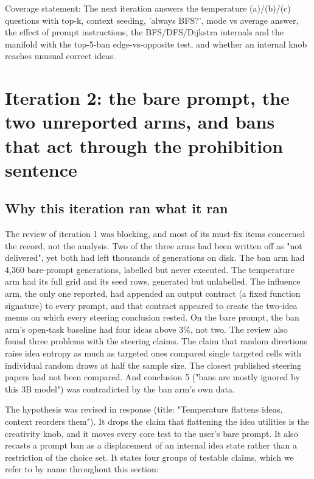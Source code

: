 \documentclass[11pt,letterpaper]{article}
\begin{document}
Coverage statement: The next iteration answers the temperature (a)/(b)/(c) questions with top-k, context seeding, 'always BFS?', mode vs average answer, the effect of prompt instructions, the BFS/DFS/Dijkstra internals and the manifold with the top-5-ban edge-vs-opposite test, and whether an internal knob reaches unusual correct ideas.
\section{Iteration 2: the bare prompt, the two unreported arms, and bans that act through the prohibition sentence}
\subsection{Why this iteration ran what it ran}
The review of iteration 1 was blocking, and most of its must-fix items concerned the record, not the analysis. Two of the three arms had been written off as "not delivered", yet both had left thousands of generations on disk. The ban arm had 4,360 bare-prompt generations, labelled but never executed. The temperature arm had its full grid and its seed rows, generated but unlabelled. The influence arm, the only one reported, had appended an output contract (a fixed function signature) to every prompt, and that contract appeared to create the two-idea menus on which every steering conclusion rested. On the bare prompt, the ban arm's open-task baseline had four ideas above 3\%, not two. The review also found three problems with the steering claims. The claim that random directions raise idea entropy as much as targeted ones compared single targeted cells with individual random draws at half the sample size. The closest published steering papers had not been compared. And conclusion 5 ("bans are mostly ignored by this 3B model") was contradicted by the ban arm's own data.

The hypothesis was revised in response (title: "Temperature flattens ideas, context reorders them"). It drops the claim that flattening the idea utilities is the creativity knob, and it moves every core test to the user's bare prompt. It also recasts a prompt ban as a displacement of an internal idea state rather than a restriction of the choice set. It states four groups of testable claims, which we refer to by name throughout this section:
\end{document}
